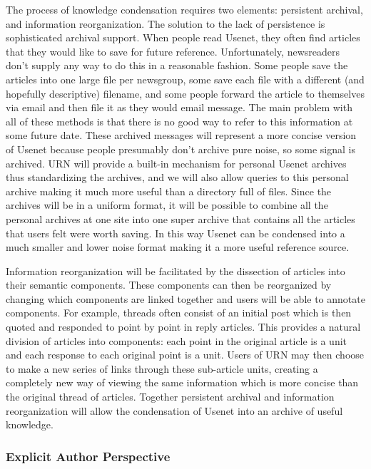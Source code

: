 The process of knowledge condensation requires two elements: persistent
archival, and  information reorganization.  The solution to the lack of
persistence is sophisticated archival support. When people read Usenet, they
often find articles that they would like to save for future reference.
Unfortunately, newsreaders don't supply any way to do this in a reasonable
fashion. Some people save the articles into one large file per newsgroup,
some save each file with a different (and hopefully descriptive) filename,
and some people forward the article to themselves via email and then file it
as they would email message. The main problem with all of these methods is
that there is no good way to refer to this information at some future date.
These archived messages will represent a more concise version of Usenet
because people presumably don't archive pure noise, so some signal is
archived. URN will provide a built-in mechanism for personal Usenet archives
thus standardizing the archives, and we will also allow queries to this
personal archive making it much more useful than a directory full of files.
Since the archives will be in a uniform format, it will be possible to
combine all the personal archives at one site into one super archive that
contains all the articles that users felt were worth saving. In this way
Usenet can be condensed into a much smaller and lower noise format making it
a more useful reference source.

Information reorganization will be facilitated by the dissection of articles
into their semantic components. These components can then be reorganized by
changing which components are linked together and users will be able to
annotate components. For example, threads often consist of an initial post
which is then quoted and responded to point by point in reply articles. This
provides a natural division of articles into components: each point in the
original article is a unit and each response to each original point is a
unit. Users of URN may then choose to make a new series of links through
these sub-article units, creating a completely new way of viewing the same
information which is more concise than the original thread of articles.
Together persistent archival and information reorganization will allow the
condensation of Usenet into an archive of useful knowledge.

\subsubsection{Explicit Author Perspective}


